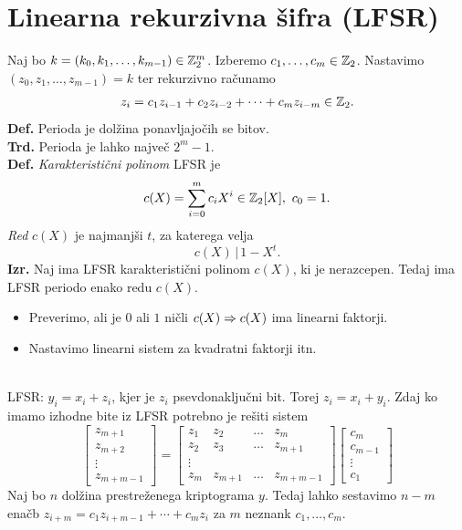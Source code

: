 \section{Linearna rekurzivna šifra (LFSR)}
Naj bo \(k = (k_0, k_1, \ldots, k_{m-1}) \in \mathbb{Z}_2^m\). Izberemo \(c_1, \ldots, c_m \in \mathbb{Z}_2\). Nastavimo \((z_0, z_1, \ldots, z_{m-1}) = k\) ter rekurzivno računamo
\[
    z_i = c_1 z_{i-1} + c_2 z_{i-2} + \cdots + c_mz_{i-m} \in \mathbb{Z}_2.
\]
\textbf{Def.} Perioda je dolžina ponavljajočih se bitov.\\
\textbf{Trd.} Perioda je lahko največ \(2^m - 1\).\\
\textbf{Def.} \emph{Karakteristični polinom} LFSR je 
\[
    c(X) = \sum_{i=0}^{m} c_i X^i \in \mathbb{Z}_2[X],\ c_0 = 1.
\]
\emph{Red} \(c(X)\) je najmanjši \(t\), za katerega velja 
\[
    c(X)\,|\, 1 - X^t.
\]
\textbf{Izr.} Naj ima LFSR karakteristični polinom \(c(X)\), ki je nerazcepen. Tedaj ima LFSR periodo enako redu \(c(X)\).\\
\begin{itemize}
    \item Preverimo, ali je \(0\) ali \(1\) ničli \(c(X) \Rightarrow c(X)\) ima linearni faktorji.
    \item Nastavimo linearni sistem za kvadratni faktorji itn.
\end{itemize}
\\
LFSR: \(y_i = x_i + z_i\), kjer je \(z_i\) psevdonaključni bit. Torej \(z_i = x_i + y_i\). Zdaj ko imamo izhodne bite iz LFSR potrebno je rešiti sistem 
\[
    \begin{bmatrix}
        z_{m+1} \\ z_{m+2} \\ \vdots \\ z_{m+m - 1}
    \end{bmatrix} = 
    \begin{bmatrix}
        z_1 & z_2 & \ldots & z_m \\
        z_2 & z_3 & \ldots & z_{m+1} \\
        \vdots \\
        z_m & z_{m+1} & \ldots & z_{m+m - 1} 
    \end{bmatrix}
    \begin{bmatrix}
        c_{m} \\ c_{m-1} \\ \vdots \\ c_{1}
    \end{bmatrix}
\]
Naj bo \(n\) dolžina prestreženega kriptograma \(y\). Tedaj lahko sestavimo \(n - m\) enačb \(z_{i+m} = c_1 z_{i+m-1} + \cdots + c_m z_i\) za \(m\) neznank \(c_1, \ldots, c_m\).